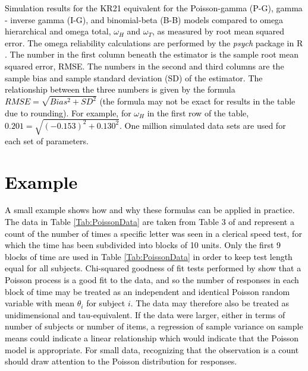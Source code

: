 \documentclass[12pt,epsfig]{article}
\newcommand{\changed}[1]{\textcolor{black}{#1}}
\begin{document}
\begin{table} [h]
\caption{\changed{Simulation results for the  KR21 equivalent for the Poisson-gamma (P-G), gamma -  inverse gamma (I-G), and binomial-beta (B-B) models compared to omega hierarchical and omega total, $\omega_H$ and $\omega_{T}$, as measured by root mean squared error. The omega reliability calculations are performed by the \emph{psych} package in R \citep{PsychPackage}. The number in the first column beneath the estimator is the sample root mean squared error, RMSE. The numbers in the second and third columns are the sample bias and sample standard deviation (SD) of the estimator. The relationship between the three numbers is given by the formula $RMSE = \sqrt{Bias^2 + SD^2}$ (the formula may not be exact for results in the table due to rounding). For example, for $\omega_H$ in the first row of the table, $0.201 = \sqrt{(-0.153)^2 + 0.130^2}$. One million simulated data sets are used for each set of parameters.  }}

\label{Tab:OmegaSimulationStudy}
\end{table}

\section{\changed{Example}}

\changed{A small example shows how and why these formulas can be applied in practice. The data in Table \ref{Tab:PoissonData} are taken from Table 3 of \cite{Moore1970} and represent a count of the number of times a specific letter was seen in a clerical speed test, for which the time has been subdivided into blocks of 10 units. Only the first 9 blocks of time are used in Table \ref{Tab:PoissonData} in order to keep test length equal for all subjects. Chi-squared goodness of fit tests performed by \cite{Moore1970} show that a Poisson process is a good fit to the data, and so the number of responses in each block of time may be treated as an independent and identical Poisson random variable with mean $\theta_i$ for subject $i$. The data may therefore also be treated as unidimensional and tau-equivalent. If the data were larger, either in terms of number of subjects or number of items, a regression of sample variance on sample means could indicate a linear relationship which would indicate that the Poisson model is appropriate. For small data, recognizing that the observation is a count should draw attention to the Poisson distribution for responses.}
\end{document}
